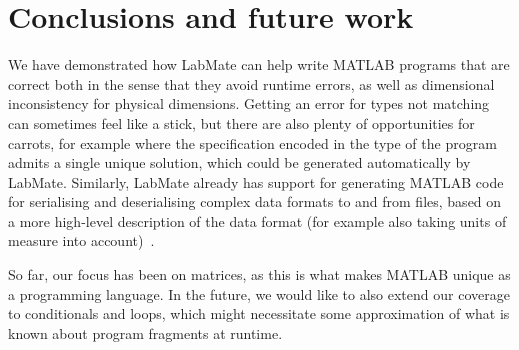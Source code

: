 \documentclass{ws-procs9x6}
\begin{document}
\section{Conclusions and future work}

We have demonstrated how LabMate can help write MATLAB programs that are correct both in the sense that they avoid runtime errors, as well as dimensional inconsistency for physical dimensions.
%
Getting an error for types not matching can sometimes feel like a stick, but there are also plenty of opportunities for carrots, for example where the specification encoded in the type of the program admits a single unique solution, which could be generated automatically by LabMate.
%
Similarly, LabMate already has support for generating MATLAB code for serialising and deserialising complex data formats to and from files, based on a more high-level description of the data format (for example also taking units of measure into account)~\cite{mgen}.

So far, our focus has been on matrices, as this is what makes MATLAB
unique as a programming language.
%
In the future, we would like to also extend our coverage to
conditionals and loops, which might necessitate some approximation of
what is known about program fragments at runtime.



\end{document}

